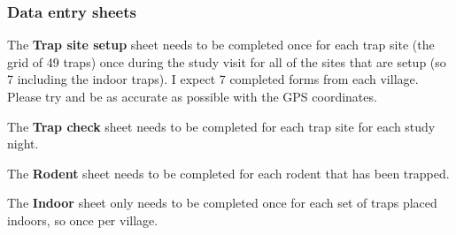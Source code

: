 \documentclass[
]{article}
\begin{document}
\hypertarget{data-entry-sheets}{%
\subsubsection{Data entry sheets}\label{data-entry-sheets}}

The \textbf{Trap site setup} sheet needs to be completed once for each
trap site (the grid of 49 traps) once during the study visit for all of
the sites that are setup (so 7 including the indoor traps). I expect 7
completed forms from each village. Please try and be as accurate as
possible with the GPS coordinates.

The \textbf{Trap check} sheet needs to be completed for each trap site
for each study night.

The \textbf{Rodent} sheet needs to be completed for each rodent that has
been trapped.

The \textbf{Indoor} sheet only needs to be completed once for each set
of traps placed indoors, so once per village.
\end{document}
